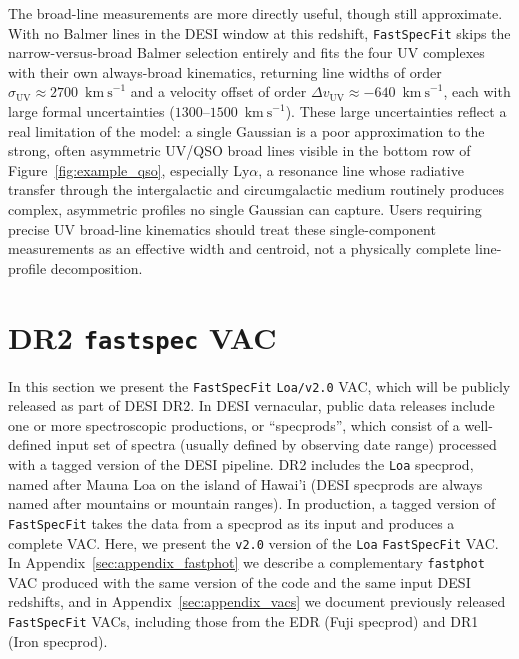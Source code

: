 \documentclass[modern,linenumbers]{aastex701}
\newcommand{\fastspecfit}{\texttt{FastSpecFit}}
\newcommand{\fastspec}{\texttt{fastspec}}
\newcommand{\fastphot}{\texttt{fastphot}}
\newcommand{\kms}{\ensuremath{\mathrm{km~s}^{-1}}}
\begin{document}
The broad-line measurements are more directly useful, though still
approximate. With no Balmer lines in the DESI window at this redshift,
\fastspecfit{} skips the narrow-versus-broad Balmer selection entirely
and fits the four UV complexes with their own always-broad kinematics,
returning line widths of order $\sigma_\mathrm{UV}\approx2700$~\kms{}
and a velocity offset of order $\Delta v_\mathrm{UV}\approx-640$~\kms{},
each with large formal uncertainties ($1300$--$1500$~\kms{}). These
large uncertainties reflect a real limitation of the model: a single
Gaussian is a poor approximation to the strong, often asymmetric
UV/QSO broad lines visible in the bottom row of
Figure~\ref{fig:example_qso}, especially Ly$\alpha$, a resonance line
whose radiative transfer through the intergalactic and circumgalactic
medium routinely produces complex, asymmetric profiles no single
Gaussian can capture. Users requiring precise UV broad-line kinematics
should treat these single-component measurements as an effective
width and centroid, not a physically complete line-profile
decomposition.


\section{DR2 \fastspec{} VAC}
\label{sec:vac}

In this section we present the \fastspecfit{} \texttt{Loa/v2.0} VAC,
which will be publicly released as part of DESI DR2. In DESI
vernacular, public data releases include one or more spectroscopic
productions, or ``specprods'', which consist of a well-defined input
set of spectra (usually defined by observing date range) processed
with a tagged version of the DESI pipeline. DR2 includes the
\texttt{Loa} specprod, named after Mauna Loa on the island of Hawai'i
(DESI specprods are always named after mountains or mountain
ranges). In production, a tagged version of \fastspecfit{} takes the
data from a specprod as its input and produces a complete VAC. Here,
we present the \texttt{v2.0} version of the \texttt{Loa}
\fastspecfit{} VAC. In Appendix~\ref{sec:appendix_fastphot} we
describe a complementary \fastphot{} VAC produced with the same
version of the code and the same input DESI redshifts, and in
Appendix~\ref{sec:appendix_vacs} we document previously released
\fastspecfit{} VACs, including those from the EDR (Fuji specprod) and
DR1 (Iron specprod).
\end{document}
